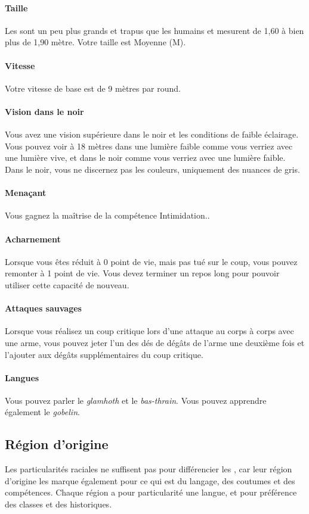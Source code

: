 \documentclass[a4paper,10pt,openany]{book}
\begin{document}
\begin{multicols}{2}
\paragraph{Taille}
Les \DemiOrcs sont un peu plus grands et trapus que les humains et mesurent de 1,60 à bien plus de 1,90 mètre. Votre taille est Moyenne (M).
\paragraph{Vitesse}
Votre vitesse de base est de 9 mètres par round.
\paragraph{Vision dans le noir}
Vous avez une vision supérieure dans le noir et les conditions de faible éclairage. Vous pouvez voir à 18 mètres dans une lumière faible comme vous
verriez avec une lumière vive, et dans le noir comme vous verriez avec une lumière faible. Dans le noir, vous ne discernez pas les couleurs,
uniquement des nuances de gris.
\paragraph{Menaçant}
Vous gagnez la maîtrise de la compétence Intimidation..
\paragraph{Acharnement}
Lorsque vous êtes réduit à 0 point de vie, mais pas tué sur le coup, vous pouvez remonter à 1 point de vie. Vous devez terminer un repos long pour
pouvoir utiliser cette capacité de nouveau.
\paragraph{Attaques sauvages}
Lorsque vous réalisez un coup critique lors d’une attaque au corps à corps avec une arme, vous pouvez jeter l’un des dés de dégâts de l’arme une
deuxième fois et l’ajouter aux dégâts supplémentaires du coup critique.
\paragraph{Langues}
Vous pouvez parler le \emph{glamhoth} et le \emph{bas-thrain}. Vous pouvez apprendre également le \emph{gobelin}.

\subsection{Région d’origine}
Les particularités raciales ne suffisent pas pour différencier les \PJs, car leur région d’origine les marque également pour ce qui est du
langage, des coutumes et des compétences. Chaque région a pour particularité une langue, et pour préférence des classes et des historiques.


\end{multicols}
\end{document}
